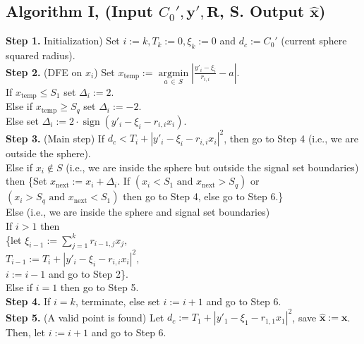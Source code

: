 \documentclass[english,12pt,a4paper,pdftex,sci,utf8]{aaltothesis}
\begin{document}
\newpage
\subsection*{Algorithm I, (Input $C_0', \mathbf{y'}, \mathbf{R}$, S. Output $\mathbf{\hat{x}}$)}
\textbf{Step 1.} Initialization) Set $i := k, T_k := 0, \xi_k := 0$ and $d_c := C_0'$ (current sphere 
\indent squared radius). \\

\noindent \textbf{Step 2.} (DFE on $x_i$) Set $x_{\text{temp}} :=\underset{a\,\in\,S}{\operatorname{argmin}}\left|\frac{y'_i - \xi_i}{r_{i,i}} - a \right|$. \\
\indent If $x_{\text{temp}} \leq S_1$ set $\Delta_i := 2$. \\
\indent Else if $x_{\text{temp}} \geq S_{q}$ set $\Delta_i := -2$. \\
\indent Else set $\Delta_i := 2 \cdot \operatorname{sign}\left(y'_i-\xi_i-r_{i,i}x_i\right)$. \\

\noindent \textbf{Step 3.} (Main step) If $d_c < T_i + \left|y'_i-\xi_i-r_{i,i}x_i\right|^2$, then go to Step 4 (i.e., we are\\
\indent outside the sphere).\\
\indent Else if $x_i \not\in S$ (i.e., we are inside the sphere but outside the signal set boundaries) \\ 
\indent then \{Set $x_{\text{next}} := x_i + \Delta_i$. If $(x_i < S_1\,\, \text{and}\,\, x_{\text{next}} > S_q)$ or \\
\indent $(x_i > S_q\,\, \text{and}\,\, x_{\text{next}} < S_{1})$ then go to Step 4, else go to Step 6.\}  \\
\indent Else (i.e., we are inside the sphere and signal set boundaries) \\
\indent\indent If $i > 1$ then \\
\indent\indent\indent \{let $\xi_{i-1} := \sum_{j=1}^{k} r_{i-1,j}x_j,$\\ 
\indent\indent\indent $T_{i-1} := T_i + \left|y'_i-\xi_i-r_{i,i}x_i\right|^2,$\\
\indent\indent\indent $i := i - 1$ and go to Step 2\}. \\
\indent\indent Else if $i=1$ then go to Step 5. \\

\noindent \textbf{Step 4.} If $i = k$, terminate, else set $i := i+1$ and go to Step 6.\\

\noindent \textbf{Step 5.} (A valid point is found) Let $d_c := T_1 + \left|y'_1-\xi_1-r_{1,1}x_1\right|^2$, save $\mathbf{\hat{x}} := \mathbf{x}$. \\
\indent Then, let $i := i+1$ and go to Step 6.\\
\end{document}
